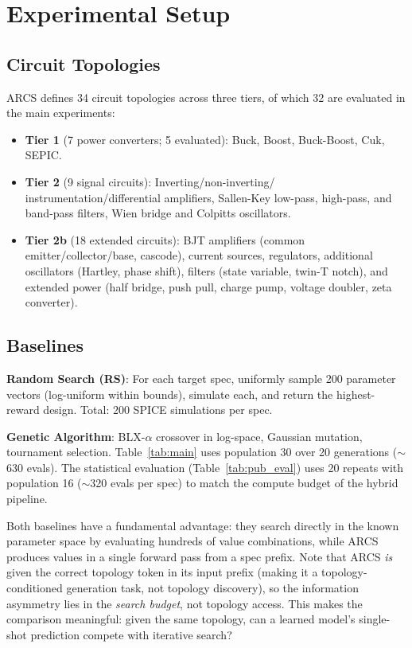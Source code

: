 \documentclass[conference]{IEEEtran}
\begin{document}
\section{Experimental Setup}
\label{sec:experiments}

\subsection{Circuit Topologies}

ARCS defines 34 circuit topologies across three tiers, of which 32 are
evaluated in the main experiments:
\begin{itemize}
    \item \textbf{Tier 1} (7 power converters; 5 evaluated): Buck, Boost,
    Buck-Boost, Cuk, SEPIC.
    \item \textbf{Tier 2} (9 signal circuits): Inverting/non-inverting/
    instrumentation/differential amplifiers, Sallen-Key low-pass, high-pass, and band-pass filters,
    Wien bridge and Colpitts oscillators.
    \item \textbf{Tier 2b} (18 extended circuits): BJT amplifiers
    (common emitter/collector/base, cascode), current sources, regulators,
    additional oscillators (Hartley, phase shift), filters (state variable,
    twin-T notch), and extended power (half bridge, push pull, charge pump,
    voltage doubler, zeta converter).
\end{itemize}

\subsection{Baselines}

\textbf{Random Search (RS)}: For each target spec, uniformly sample
200 parameter vectors (log-uniform within bounds), simulate each, and
return the highest-reward design. Total: 200 SPICE simulations per
spec.

\textbf{Genetic Algorithm}: BLX-$\alpha$ crossover in log-space,
Gaussian mutation, tournament selection. Table~\ref{tab:main} uses population 30 over 20 generations ($\sim$630 evals).
The statistical evaluation (Table~\ref{tab:pub_eval}) uses 20 repeats
with population 16 ($\sim$320 evals per spec) to match the compute
budget of the hybrid pipeline.

Both baselines have a fundamental advantage: they search directly in
the known parameter space by evaluating hundreds of value combinations,
while ARCS produces values in a single forward pass from a spec prefix.
Note that ARCS \emph{is} given the correct topology token in its input
prefix (making it a topology-conditioned generation task, not topology
discovery), so the information asymmetry lies in the \emph{search budget},
not topology access. This makes the comparison meaningful: given the same
topology, can a learned model's single-shot prediction compete with
iterative search?
\end{document}
